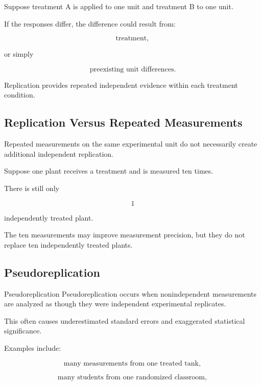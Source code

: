 Suppose treatment A is applied to one unit and treatment B to one unit.

If the responses differ, the difference could result from:

\[
\boxed{
\text{treatment},
}
\]

or simply

\[
\boxed{
\text{preexisting unit differences}.
}
\]

Replication provides repeated independent evidence within each treatment
condition.

\subsection{Replication Versus Repeated Measurements}
\label{subsec:replication-versus-repeated-measurements}

Repeated measurements on the same experimental unit do not necessarily
create additional independent replication.

Suppose one plant receives a treatment and is measured ten times.

There is still only

\[
\boxed{
1
}
\]

independently treated plant.

The ten measurements may improve measurement precision, but they do not
replace ten independently treated plants.

\subsection{Pseudoreplication}
\label{subsec:pseudoreplication}

\begin{definitionbox}{Pseudoreplication}
Pseudoreplication occurs when nonindependent measurements are analyzed as
though they were independent experimental replicates.
\end{definitionbox}

This often causes underestimated standard errors and exaggerated
statistical significance.

Examples include:

\[
\boxed{
\text{many measurements from one treated tank},
}
\]

\[
\boxed{
\text{many students from one randomized classroom},
}
\]

